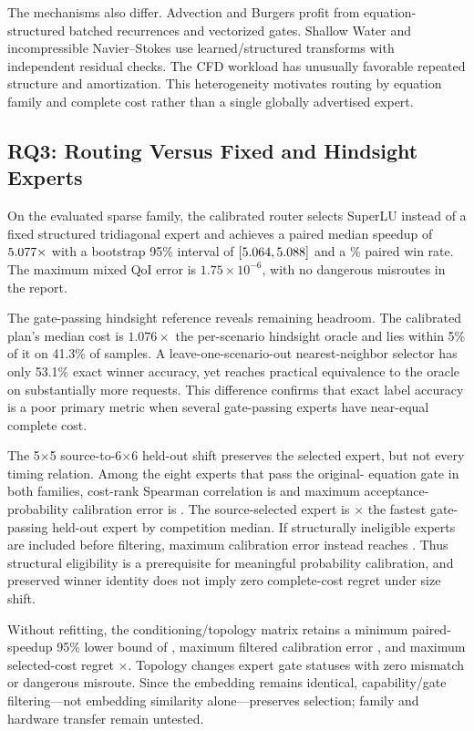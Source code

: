 The mechanisms also differ. Advection and Burgers profit from equation-structured
batched recurrences and vectorized gates. Shallow Water and incompressible
Navier--Stokes use learned/structured transforms with independent residual checks.
The CFD workload has unusually favorable repeated structure and amortization. This
heterogeneity motivates routing by equation family and complete cost rather than a
single globally advertised expert.

\subsection{RQ3: Routing Versus Fixed and Hindsight Experts}

On the evaluated sparse family, the calibrated router selects SuperLU instead of a
fixed structured tridiagonal expert and achieves a paired median speedup of
$5.077\times$ with a bootstrap 95\% interval of
$[5.064,5.088]$ and a
\CalibratedRouterWinPercent\% paired
win rate. The maximum mixed QoI error is $1.75\times10^{-6}$, with no dangerous
misroutes in the report.

The gate-passing hindsight reference reveals remaining headroom. The calibrated plan's
median cost is $1.076\times$ the per-scenario hindsight oracle and lies within 5\%
of it on 41.3\% of samples. A leave-one-scenario-out nearest-neighbor selector has
only 53.1\% exact winner accuracy, yet reaches practical equivalence to the oracle
on substantially more requests. This difference confirms that exact label accuracy
is a poor primary metric when several gate-passing experts have near-equal complete cost.

The 5$\times$5 source-to-6$\times$6 held-out shift preserves the selected expert,
but not every timing relation. Among the eight experts that pass the original-
equation gate in both families, cost-rank Spearman correlation is
\ShiftGatePassingRankSpearman{} and maximum acceptance-probability calibration error is
\ShiftGatePassingMaxCalibration{}. The source-selected expert is
\ShiftSelectedRegret{}$\times$ the fastest gate-passing held-out expert by competition
median. If structurally ineligible experts are included before filtering, maximum
calibration error instead reaches \ShiftAllMaxCalibration{}. Thus structural
eligibility is a prerequisite for meaningful probability calibration, and preserved
winner identity does not imply zero complete-cost regret under size shift.

Without refitting, the conditioning/topology matrix retains a minimum paired-speedup
95\% lower bound of \ShiftMatrixMinimumLower{}, maximum filtered calibration error
\ShiftMatrixMaximumCalibration{}, and maximum selected-cost regret
\ShiftMatrixMaximumRegret{}$\times$. Topology changes
\TopologyGateStatusChanges{} expert gate statuses with zero mismatch or dangerous
misroute. Since the embedding remains identical, capability/gate filtering---not
embedding similarity alone---preserves selection; family and hardware transfer remain
untested.

